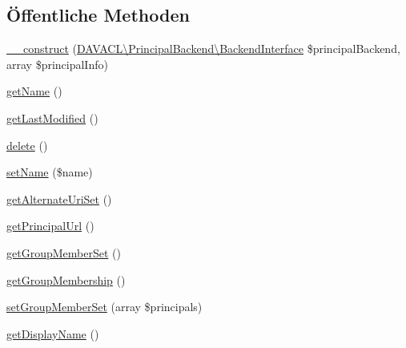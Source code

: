 \subsection*{Öffentliche Methoden}
\begin{DoxyCompactItemize}
\item 
\mbox{\hyperlink{class_sabre_1_1_cal_d_a_v_1_1_principal_1_1_proxy_write_af4d011aae815d8adcc32fff3d15c6660}{\+\_\+\+\_\+construct}} (\mbox{\hyperlink{interface_sabre_1_1_d_a_v_a_c_l_1_1_principal_backend_1_1_backend_interface}{D\+A\+V\+A\+C\+L\textbackslash{}\+Principal\+Backend\textbackslash{}\+Backend\+Interface}} \$principal\+Backend, array \$principal\+Info)
\item 
\mbox{\hyperlink{class_sabre_1_1_cal_d_a_v_1_1_principal_1_1_proxy_write_ae8c0d45f465c721ad1bb0469465bea74}{get\+Name}} ()
\item 
\mbox{\hyperlink{class_sabre_1_1_cal_d_a_v_1_1_principal_1_1_proxy_write_a4de8a2ec69b5707ccb3b737fe4e7b089}{get\+Last\+Modified}} ()
\item 
\mbox{\hyperlink{class_sabre_1_1_cal_d_a_v_1_1_principal_1_1_proxy_write_ac8470910dc1bea87cd22f8c52b24cfe1}{delete}} ()
\item 
\mbox{\hyperlink{class_sabre_1_1_cal_d_a_v_1_1_principal_1_1_proxy_write_a4daacb7dff7adb4193cd371148f6037e}{set\+Name}} (\$name)
\item 
\mbox{\hyperlink{class_sabre_1_1_cal_d_a_v_1_1_principal_1_1_proxy_write_ab33f269f2f62eb69c6f6b45f50d2e6f3}{get\+Alternate\+Uri\+Set}} ()
\item 
\mbox{\hyperlink{class_sabre_1_1_cal_d_a_v_1_1_principal_1_1_proxy_write_acc1725448da125be478676c93a0d8cc6}{get\+Principal\+Url}} ()
\item 
\mbox{\hyperlink{class_sabre_1_1_cal_d_a_v_1_1_principal_1_1_proxy_write_ab735c1ecf155a532a098a4618f499afa}{get\+Group\+Member\+Set}} ()
\item 
\mbox{\hyperlink{class_sabre_1_1_cal_d_a_v_1_1_principal_1_1_proxy_write_af370032d4f7d8140d6ac341ccf429bec}{get\+Group\+Membership}} ()
\item 
\mbox{\hyperlink{class_sabre_1_1_cal_d_a_v_1_1_principal_1_1_proxy_write_a83ad463bd6b99c4db55fc63bb37ebafb}{set\+Group\+Member\+Set}} (array \$principals)
\item 
\mbox{\hyperlink{class_sabre_1_1_cal_d_a_v_1_1_principal_1_1_proxy_write_ad5391ef6b5b3c78020e7f0db2862647d}{get\+Display\+Name}} ()
\end{DoxyCompactItemize}
